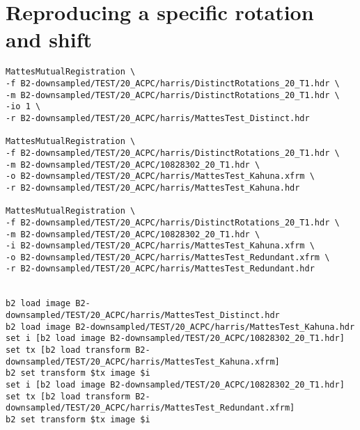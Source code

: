 \documentclass [10pt,twocolumn,twoside,final,letterpaper]{report}
\begin{document}
\section{Reproducing a specific rotation and shift}
\begin{verbatim}
MattesMutualRegistration \
-f B2-downsampled/TEST/20_ACPC/harris/DistinctRotations_20_T1.hdr \
-m B2-downsampled/TEST/20_ACPC/harris/DistinctRotations_20_T1.hdr \
-io 1 \
-r B2-downsampled/TEST/20_ACPC/harris/MattesTest_Distinct.hdr

MattesMutualRegistration \
-f B2-downsampled/TEST/20_ACPC/harris/DistinctRotations_20_T1.hdr \
-m B2-downsampled/TEST/20_ACPC/10828302_20_T1.hdr \
-o B2-downsampled/TEST/20_ACPC/harris/MattesTest_Kahuna.xfrm \
-r B2-downsampled/TEST/20_ACPC/harris/MattesTest_Kahuna.hdr

MattesMutualRegistration \
-f B2-downsampled/TEST/20_ACPC/harris/DistinctRotations_20_T1.hdr \
-m B2-downsampled/TEST/20_ACPC/10828302_20_T1.hdr \
-i B2-downsampled/TEST/20_ACPC/harris/MattesTest_Kahuna.xfrm \
-o B2-downsampled/TEST/20_ACPC/harris/MattesTest_Redundant.xfrm \
-r B2-downsampled/TEST/20_ACPC/harris/MattesTest_Redundant.hdr


b2 load image B2-downsampled/TEST/20_ACPC/harris/MattesTest_Distinct.hdr
b2 load image B2-downsampled/TEST/20_ACPC/harris/MattesTest_Kahuna.hdr
set i [b2 load image B2-downsampled/TEST/20_ACPC/10828302_20_T1.hdr]
set tx [b2 load transform B2-downsampled/TEST/20_ACPC/harris/MattesTest_Kahuna.xfrm]
b2 set transform $tx image $i
set i [b2 load image B2-downsampled/TEST/20_ACPC/10828302_20_T1.hdr]
set tx [b2 load transform B2-downsampled/TEST/20_ACPC/harris/MattesTest_Redundant.xfrm]
b2 set transform $tx image $i
\end{verbatim}



\printindex
\end{document}
